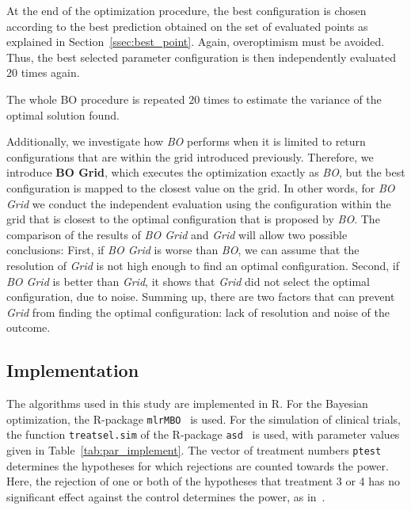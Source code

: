 \documentclass[bimj,fleqn]{w-art}
\theoremstyle{plain}
\theoremstyle{definition}
\begin{document}
At the end of the optimization procedure, the best configuration is chosen according to the best prediction obtained on the set of evaluated points as explained in Section~\ref{ssec:best_point}.
Again, overoptimism must be avoided. 
Thus, the best selected parameter configuration is then independently evaluated $20$ times again.

The whole BO procedure is repeated $20$ times to estimate the variance of the optimal solution found.

Additionally, we investigate how \emph{BO} performs when it is limited to return configurations that are within the grid introduced previously.
Therefore, we introduce \textbf{BO Grid}, which executes the optimization exactly as \emph{BO}, but the best configuration is mapped to the closest value on the grid. 
In other words, for \emph{BO Grid} we conduct the independent evaluation using the configuration within the grid that is closest to the optimal configuration that is proposed by \emph{BO}.
The comparison of the results of \emph{BO Grid} and \emph{Grid} will allow two possible conclusions:
First, if \emph{BO Grid} is worse than \emph{BO}, we can assume that the resolution of \emph{Grid} is not high enough to find an optimal configuration.
Second, if \emph{BO Grid} is better than \emph{Grid}, it shows that \emph{Grid} did not select the optimal configuration, due to noise.
Summing up, there are two factors that can prevent \emph{Grid} from finding the optimal configuration: lack of resolution and noise of the outcome.

\subsection{Implementation}

The algorithms used in this study are implemented in R.
For the Bayesian optimization, the R-package \texttt{mlrMBO}~\citep{bischl_mlrmbo_2017} is used.
For the simulation of clinical trials, the function \texttt{treatsel.sim} of the R-package \texttt{asd}~\citep{parsons_software_2011} is used, with parameter values given in Table~\ref{tab:par_implement}.
The vector of treatment numbers \texttt{ptest} determines the hypotheses for which rejections are counted towards the power.
Here, the rejection of one or both of the hypotheses that treatment 3 or 4 has no significant effect against the control determines the power, as in~\citet{friede_adaptive_2020}.
\end{document}
